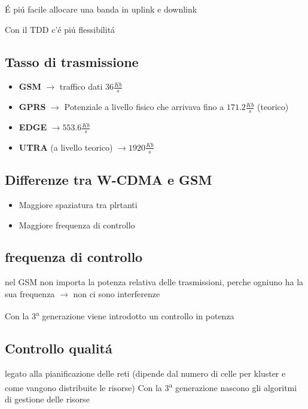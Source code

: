 \documentclass{article}
\begin{document}
\'E pi\'u facile allocare una banda in uplink e downlink

Con il TDD c'\'e pi\'u flessibilit\'a


\subsection{Tasso di trasmissione}
\begin{itemize}
    \item \textbf{GSM} $\rightarrow$ traffico dati $36 \frac{Kb}{s}$
    \item \textbf{GPRS} $\rightarrow$ Potenziale a livello fisico che arrivava fino a $171.2\frac{Kb}{s}$ (teorico)
    \item \textbf{EDGE} $\rightarrow 553.6\frac{Kb}{s}$
    \item \textbf{UTRA} (a livello teorico) $\rightarrow 1920\frac{Kb}{s}$
\end{itemize}




\subsection{Differenze tra W-CDMA e GSM }

\begin{itemize}
    \item  Maggiore spaziatura tra plrtanti
    \item Maggiore frequenza di controllo

\end{itemize}

\subsection{frequenza di controllo} nel GSM non importa la potenza relativa delle trasmissioni, perche ogniuno ha la sua frequenza $\rightarrow$ non ci sono interferenze

Con la 3\textsuperscript{a} generazione viene introdotto un controllo in potenza


\subsection{Controllo qualit\'a}
legato alla pianificazione delle reti (dipende dal numero di celle per kluster e come vangono distribuite le risorse) Con la 3\textsuperscript{a} generazione nascono gli algoritmi di gestione delle risorse
\end{document}
